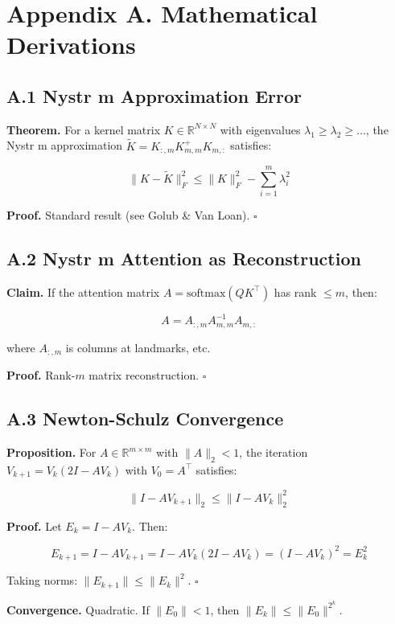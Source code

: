 
\section{Appendix A. Mathematical Derivations}

\subsection{A.1 Nystr m Approximation Error}

\textbf{Theorem.} For a kernel matrix $K \in \mathbb{R}^{N \times N}$ with 
eigenvalues $\lambda_1 \geq \lambda_2 \geq \dots$, the Nystr m 
approximation $\tilde{K} = K_{:, m} K_{m, m}^+ K_{m, :}$ satisfies:

\[
\|K - \tilde{K}\|_F^2 \leq \|K\|_F^2 - \sum_{i=1}^{m} \lambda_i^2
\tag{A.1}
\]

\textbf{Proof.} Standard result (see Golub \& Van Loan). $\square$

\subsection{A.2 Nystr m Attention as Reconstruction}

\textbf{Claim.} If the attention matrix $A = \text{softmax}(Q K^\top)$ has rank $\leq m$, 
then:

\[
A = A_{:, m} A_{m, m}^{-1} A_{m, :}
\tag{A.2}
\]

where $A_{:, m}$ is columns at landmarks, etc.

\textbf{Proof.} Rank-$m$ matrix reconstruction. $\square$

\subsection{A.3 Newton-Schulz Convergence}

\textbf{Proposition.} For $A \in \mathbb{R}^{m \times m}$ with $\|A\|_2 < 1$, 
the iteration $V_{k+1} = V_k (2I - A V_k)$ with $V_0 = A^\top$ satisfies:

\[
\|I - A V_{k+1}\|_2 \leq \|I - A V_k\|_2^2
\tag{A.3}
\]

\textbf{Proof.} Let $E_k = I - A V_k$. Then:

\[
E_{k+1} = I - A V_{k+1} = I - A V_k (2I - A V_k) = (I - A V_k)^2 = E_k^2
\tag{A.4}
\]

Taking norms: $\|E_{k+1}\| \leq \|E_k\|^2$. $\square$

\textbf{Convergence.} Quadratic. If $\|E_0\| < 1$, then $\|E_k\| \leq \|E_0\|^{2^k}$.

